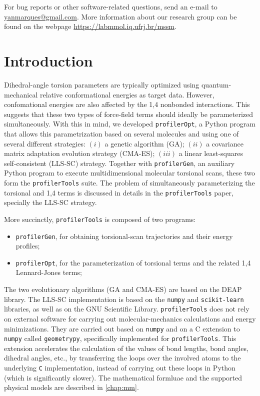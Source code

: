 \documentclass[10pt,a4paper,openany]{memoir}
\numberwithin{equation}{section}
\newcommand{\profileropt}[0]{\texttt{profilerOpt}}
\newcommand{\profilergen}[0]{\texttt{profilerGen}}
\newcommand{\profilertools}[0]{\texttt{profilerTools}}
\begin{document}
  For bug reports or other software-related questions, send an e-mail
  to \url{yanmarques@gmail.com}.  More information about our research
  group can be found on the webpage
  \url{https://labmmol.iq.ufrj.br/mssm}.

\tableofcontents

  \mainmatter

\newcommand*{\profi}{\texttt{profilerOpt}}

\chapter{Introduction}
\label{chap:intro}

Dihedral-angle torsion parameters are typically optimized using
quantum-mechanical relative conformational energies as target data.
%
However, confomational energies are also affected by the 1,4 nonbonded
interactions.
%
This suggests that these two types of force-field terms should ideally
be parameterized simultaneously.
%
With this in mind, we developed \profileropt{}, a Python program that
allows this parametrization based on several molecules and using one
of several different strategies: $(i)$ a genetic algorithm (GA);
$(ii)$ a covariance matrix adaptation evolution strategy (CMA-ES);
$(iii)$ a linear least-squares self-consistent (LLS-SC) strategy.
%
Together with \profilergen{}, an auxiliary Python program to execute
multidimensional molecular torsional scans, these two form the
\profilertools{} suite.
%
The problem of simultaneously parameterizing the torsional and 1,4
terms is discussed in details in the \profilertools{}
paper\cite{PAPER}, specially the LLS-SC strategy.
%

More succinctly, \profilertools{} is composed of two programs:

\begin{itemize}
\item \profilergen, for obtaining torsional-scan trajectories and
  their energy profiles;
\item \profileropt, for the parameterization of torsional terms and
  the related 1,4 Lennard-Jones terms;
\end{itemize}

The two evolutionary algorithms (GA and CMA-ES) are based on the DEAP
library\cite{DEAP}.
%
The LLS-SC implementation is based on the \texttt{numpy} and
\texttt{scikit-learn} libraries, as well as on the GNU Scientific
Library.
%
\profilertools{} does not rely on external software for carrying out
molecular-mechanics calculations and energy minimizations.
%
They are carried out based on \texttt{numpy} and on a C extension to
\texttt{numpy} called \texttt{geometrypy}, specifically implemented
for \profilertools{}. This extension accelerates the calculation of
the values of bond lengths, bond angles, dihedral angles, etc., by
transferring the loops over the involved atoms to the underlying
\texttt{C} implementation, instead of carrying out these loops in
Python (which is significantly slower).
%
The
mathematical formluae and the supported physical models are described
in \autoref{chap:mm}. 
\end{document}
